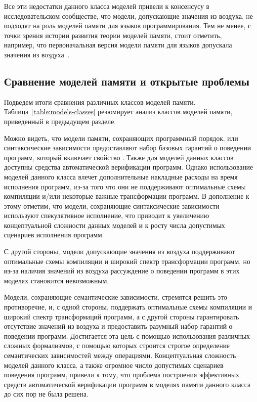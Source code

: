 Все эти недостатки данного класса моделей
привели к консенсусу в исследовательском сообществе,
что модели, допускающие значения из воздуха,
не подходят на роль моделей памяти 
для языков программирования.
Тем не менее, с точки зрения истории развития
теории моделей памяти, стоит отметить, например,
что первоначальная версия модели памяти для языков \CPP
допускала значения из воздуха~\cite{Batty-al:POPL11}.

\subsection{Сравнение моделей памяти и открытые проблемы}
\label{sec:models-summary}

Подведем итоги сравнения различных классов моделей памяти. 
Таблица~\ref{table:models-classes} резюмирует 
анализ классов моделей памяти, приведенный в 
предыдущем разделе.



Можно видеть, что модели памяти,
сохраняющих программный порядок, или синтаксические зависимости 
предоставляют набор базовых гарантий о поведении программ, 
который включает свойство \DRF. Также для моделей данных классов 
доступны средства автоматической верификации программ.
Однако использование моделей данного класса влечет 
дополнительные накладные расходы на время исполнения программ, 
из-за того что они не поддерживают оптимальные схемы компиляции
и/или некоторые важные трансформации программ.
В дополнение к этому отметим, что модели,
сохраняющие синтаксические зависимости используют спекулятивное исполнение, 
что приводит к увеличению концептуальной сложности данных моделей 
и к росту числа допустимых сценариев исполнения программ. 

С другой стороны, модели допускающие значения из воздуха 
поддерживают оптимальные схемы компиляции и широкий спектр 
трансформации программ, но из-за наличия значений из воздуха 
рассуждение о поведении программ в этих моделях становится невозможным. 

Модели, сохраняющие семантические зависимости, стремятся 
решить это противоречие, и, с одной стороны, 
поддержать оптимальные схемы компиляции и широкий спектр 
трансформаций программ, а с другой стороны 
гарантировать отсутствие значений из воздуха 
и предоставить разумный набор гарантий о поведении программ.
Достигается эта цель с помощью использования различных 
сложных формализмов, с помощью которых строится строгое определение
семантических зависимостей между операциями.
Концептуальная сложность моделей данного класса, 
а также огромное число допустимых сценариев поведения программ,
привели к тому, что проблема построения эффективных 
средств автоматической верификации программ в 
моделях памяти данного класса до сих пор не была решена. 

